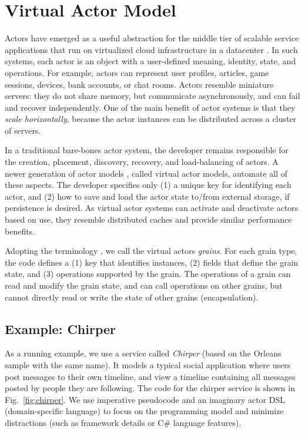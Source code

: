 \section{Virtual Actor Model}\label{sec:virtualactors}

Actors have emerged as a useful abstraction for the middle tier of scalable service applications that run on virtualized cloud infrastructure in a datacenter . In such systems, each actor is an object with a user-defined meaning, identity, state, and operations. For example, actors can represent user profiles, articles, game sessions, devices, bank accounts, or chat rooms. Actors resemble miniature servers: they do not share memory, but communicate asynchronously, and can fail and recover independently. One of the main benefit of actor systems is that they \emph{scale horizontally}, because the actor instances can be distributed across a cluster of servers.

In a traditional bare-bones actor system, the developer remains responsible for the creation, placement, discovery, recovery, and load-balancing of actors. A newer generation of actor models \cite{orleans,orbit,sfactors}, called virtual actor models, automate all of these aspects. The developer specifies only (1) a unique key for identifying each actor, and (2) how to save and load the actor state to/from external storage, if persistence is desired. As virtual actor systems can activate and deactivate actors based on use, they resemble distributed caches \cite{memcached} and provide similar performance benefits. 

Adopting the terminology \cite{orleanstr,orleans-socc}, we call the virtual actors \emph{grains}. For each grain type, the code defines a (1) key that identifies instances, (2)  fields that define the grain state, and (3) operations supported by the grain. The operations of a grain can read and modify the grain state, and can call operations on other grains, but cannot directly read or write the state of other grains (encapsulation). 
 
\subsection{Example: Chirper}

As a running example, we use a service called \emph{Chirper} (based on the Orleans sample with the same name). It models a typical social application where users post messages to their own timeline, and view a timeline containing all messages posted by people they are following.
The code for the chirper service is shown in Fig.~\ref{fig:chirper}. We use imperative pseudocode and an imaginary actor DSL (domain-specific language) to focus on the programming model and minimize distractions (such as framework details or C\# language features). 

